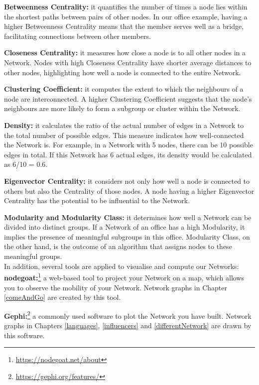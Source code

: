 \documentclass[12pt,a4paper,oneside]{book}
\begin{document}
\begin{sloppypar}
\textbf{Betweenness Centrality:} it quantifies the number of times a node lies within the shortest paths between pairs of other nodes. In our office example, having a higher Betweenness Centrality means that the member serves well as a bridge, facilitating connections between other members.

\textbf{Closeness Centrality:} it measures how close a node is to all other nodes in a Network. Nodes with high Closeness Centrality have shorter average distances to other nodes, highlighting how well a node is connected to the entire Network.

\textbf{Clustering Coefficient:} it computes the extent to which the neighbours of a node are interconnected. A higher Clustering Coefficient suggests that the node's neighbours are more likely to form a subgroup or cluster within the Network.

\textbf{Density:} it calculates the ratio of the actual number of edges in a Network to the total number of possible edges. This measure indicates how well-connected the Network is. For example, in a Network with 5 nodes, there can be 10 possible edges in total. If this Network has 6 actual edges, its density would be calculated as 6/10 = 0.6.

\textbf{Eigenvector Centrality:} it considers not only how well a node is connected to others but also the Centrality of those nodes. A node having a higher Eigenvector Centrality has the potential to be influential to the Network.

\textbf{Modularity and Modularity Class:} it determines how well a Network can be divided into distinct groups. If a Network of an office has a high Modularity, it implies the presence of meaningful subgroups in this office. Modularity Class, on the other hand, is the outcome of an algorithm that assigns nodes to these meaningful groups.
\\

In addition, several tools are applied to visualise and compute our Networks:
\\

\textbf{nodegoat:}\footnote{\url{https://nodegoat.net/about}} a web-based tool to project your Network on a map, which allows you to observe the mobility of your Network. Network graphs in Chapter \ref{comeAndGo} are created by this tool.

\textbf{Gephi:}\footnote{\url{https://gephi.org/features/}} a commonly used software to plot the Network you have built. Network graphs in Chapters \ref{languages}, \ref{influencers} and \ref{differentNetwork} are drawn by this software.


\end{sloppypar}
\end{document}
